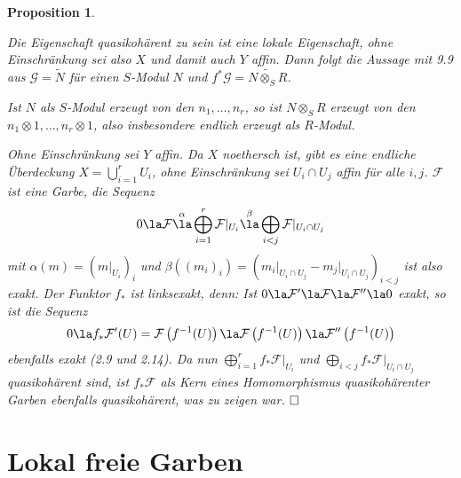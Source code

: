 \documentclass[11pt]{book}
\newtheorem{proposition}[theorem]{Proposition}
\theoremstyle{nonumberbreak}
\newenvironment{pr}[1][]{\ifthenelse{\equal{#1}{}}{\proof}{\proof[#1]}\rm}{\endproof}
\begin{document}
\begin{spacing}{1.4}
\begin{proposition}
\begin{pr}
\begin{compactenum}
\item Die Eigenschaft quasikohärent zu sein ist eine lokale Eigenschaft, ohne Einschränkung sei also $X$ und damit auch $Y$ affin. Dann folgt die Aussage mit 9.9 aus $\mathcal{G} = \tilde{N}$ für einen $S$-Modul $N$ und $f^* \mathcal{G} = \widetilde{N \otimes_S R}$.
\item Ist $N$ als $S$-Modul erzeugt von den $n_1, \ldots, n_r$, so ist $N \otimes_S R$ erzeugt von den $n_1 \otimes 1, \ldots, n_r \otimes 1$, also insbesondere endlich erzeugt als $R$-Modul.
\item Ohne Einschränkung sei $Y$ affin. Da $X$ noethersch ist, gibt es eine endliche Überdeckung $X= \bigcup_{i=1}^r U_i$, ohne Einschränkung sei $U_i \cap U_j$ affin für alle $i,j$. $\mathcal{F}$ ist eine Garbe, die Sequenz
$$0 \la \mathcal{F} \overset{\alpha}{\la} \bigoplus_{i=1}^r \mathcal{F}\vert_{U_i} \overset{\beta}{\la} \bigoplus_{i < j} \mathcal{F} \vert_{U_i \cap U_j}$$
mit $\alpha(m) = \left( m \vert_{U_i}\right)_i$ und $\beta\left( (m_i)_i\right) = \left( m_i \vert_{U_i \cap U_j} - m_j \vert_{U_i \cap U_j} \right)_{i < j}$
ist also exakt. Der Funktor $f_*$ ist linksexakt, denn: Ist $0 \la \mathcal{F}' \la \mathcal{F} \la \mathcal{F}'' \la 0$ exakt, so ist die Sequenz $$0 \la f_* \mathcal{F}'(U) = \mathcal{F}\left(f^{-1}(U)\right) \la \mathcal{F}\left(f^{-1}(U)\right) \la \mathcal{F}'' \left(f^{-1}(U)\right)$$ ebenfalls exakt (2.9 und 2.14). Da nun $\bigoplus_{i=1}^r f_* \mathcal{F} \vert_{U_i}$ und $\bigoplus_{i<j} f_* \mathcal{F} \vert_{U_i \cap U_j}$ quasikohärent sind, ist $f_* \mathcal{F}$ als Kern eines Homomorphismus quasikohärenter Garben ebenfalls quasikohärent, was zu zeigen war. $\hfill \Box$



\end{compactenum}
\end{pr}

\end{proposition}






\renewcommand*\thesection{§ \arabic{section}\quad}
\section{Lokal freie Garben} %
\renewcommand*\thesection{\arabic{section}}




\end{spacing}
\end{document}
